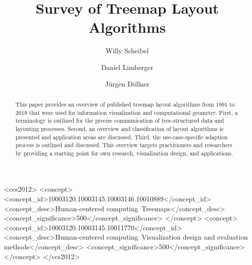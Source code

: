 \documentclass[sigconf%
,natbib=true%
]{acmart}
\begin{document}
\title{Survey of Treemap Layout Algorithms}

\author{Willy Scheibel}
\author{Daniel Limberger}
\author{J{\"u}rgen D{\"o}llner}

\renewcommand{\shortauthors}{W.~Scheibel, D.~Limberger, J.~D{\"o}llner}

\begin{abstract}
    This paper provides an overview of published treemap layout algorithms from 1991 to 2019 that were used for information visualization and computational geometry.
    First, a terminology is outlined for the precise communication of tree-structured data and layouting processes.
    Second, an overview and classification of layout algorithms is presented and application areas are discussed.
    Third, the use-case-specific adaption process is outlined and discussed.
    This overview targets practitioners and researchers by providing a starting point for own research, visualization design, and applications.
\end{abstract}

\begin{CCSXML}
    <ccs2012>
    <concept>
    <concept_id>10003120.10003145.10003146.10010889</concept_id>
    <concept_desc>Human-centered computing~Treemaps</concept_desc>
    <concept_significance>500</concept_significance>
    </concept>
    <concept>
    <concept_id>10003120.10003145.10011770</concept_id>
    <concept_desc>Human-centered computing~Visualization design and evaluation methods</concept_desc>
    <concept_significance>500</concept_significance>
    </concept>
    </ccs2012>
\end{CCSXML}


\end{document}
